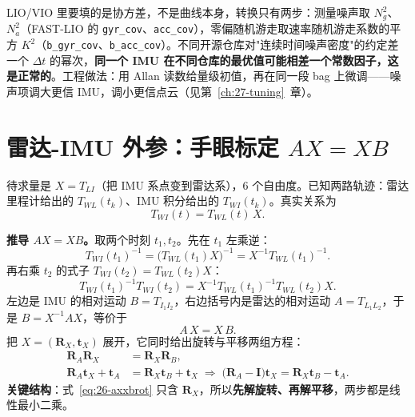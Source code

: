 LIO/VIO 里要填的是协方差，不是曲线本身，转换只有两步：测量噪声取 $N_g^2$、$N_a^2$（FAST-LIO 的 \lstinline{gyr_cov}、\lstinline{acc_cov}），零偏随机游走取速率随机游走系数的平方 $K^2$（\lstinline{b_gyr_cov}、\lstinline{b_acc_cov}）。不同开源仓库对"连续时间噪声密度"的约定差一个 $\Delta t$ 的幂次，\textbf{同一个 IMU 在不同仓库的最优值可能相差一个常数因子，这是正常的}。工程做法：用 Allan 读数给量级初值，再在同一段 bag 上微调——噪声项调大更信 IMU，调小更信点云（见第~\ref{ch:27-tuning}~章）。

\section{雷达-IMU 外参：手眼标定 $AX=XB$}\label{sec:26-handeye}

待求量是 $X=T_{LI}$（把 IMU 系点变到雷达系），6 个自由度。已知两路轨迹：雷达里程计给出的 $T_{WL}(t_k)$、IMU 积分给出的 $T_{WI}(t_k)$。真实关系为
\begin{equation}
T_{WI}(t)=T_{WL}(t)\,X.
\label{eq:26-handerel}
\end{equation}

\textbf{推导 $AX=XB$。}取两个时刻 $t_1,t_2$。先在 $t_1$ 左乘逆：
\begin{equation}
T_{WI}(t_1)^{-1}=\bigl(T_{WL}(t_1)X\bigr)^{-1}=X^{-1}T_{WL}(t_1)^{-1}.
\end{equation}
再右乘 $t_2$ 的式子 $T_{WI}(t_2)=T_{WL}(t_2)X$：
\begin{equation}
T_{WI}(t_1)^{-1}T_{WI}(t_2)=X^{-1}T_{WL}(t_1)^{-1}T_{WL}(t_2)X.
\end{equation}
左边是 IMU 的相对运动 $B=T_{I_1I_2}$，右边括号内是雷达的相对运动 $A=T_{L_1L_2}$，于是 $B=X^{-1}AX$，等价于
\begin{equation}
A\,X=X\,B.
\label{eq:26-axxb}
\end{equation}
把 $X=(\bm{R}_X,\bm{t}_X)$ 展开，它同时给出旋转与平移两组方程：
\begin{align}
\bm{R}_A\bm{R}_X &= \bm{R}_X\bm{R}_B, \label{eq:26-axxbrot}\\
\bm{R}_A\bm{t}_X+\bm{t}_A &= \bm{R}_X\bm{t}_B+\bm{t}_X
\;\Longrightarrow\;
\bigl(\bm{R}_A-\bm{I}\bigr)\bm{t}_X=\bm{R}_X\bm{t}_B-\bm{t}_A.
\label{eq:26-axxbt}
\end{align}
\textbf{关键结构}：式~\eqref{eq:26-axxbrot} 只含 $\bm{R}_X$，所以\textbf{先解旋转、再解平移}，两步都是线性最小二乘。

